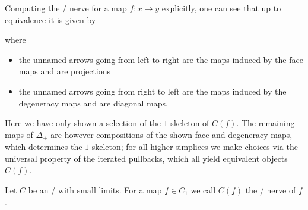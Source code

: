 \begin{remark}
    Computing the \Cech/ nerve for a map $f\colon x\to y$ explicitly, one can see that up to equivalence it is given by
    \begin{center}
    \end{center}
    where
    \begin{itemize}
        \item the unnamed arrows going from left to right are the maps induced by the face maps and are projections 
        \item the unnamed arrows going from right to left are the maps induced by the degeneracy maps and are diagonal maps. 
    \end{itemize}
    Here we have only shown a selection of the $1$-skeleton of $C(f)$.
    The remaining maps of $\Delta_+$ are however compositions of the shown face and degeneracy maps, which determines the $1$-skeleton; for all higher simplices we make choices via the universal property of the iterated pullbacks, which all yield equivalent objects $C(f)$. %
\end{remark}
\begin{definition}
    Let $C$ be an \inftycat/ with small limits. 
    For a map $f\in C_1$ we call $C(f)$ the \Cech/ nerve of $f$.
\end{definition}
